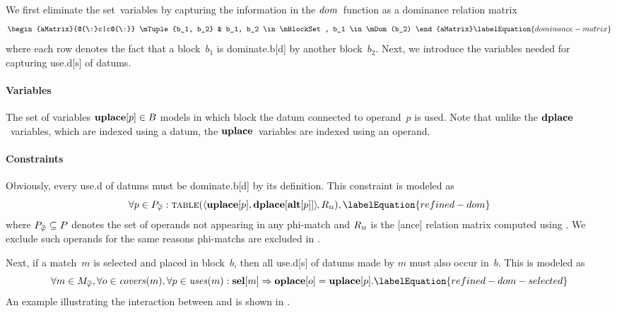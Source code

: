 We first eliminate the set~\glspl{variable} by capturing the information in the
$\operatorname{\textrm{\textit{dom}}}$~\gls{function} as a dominance relation matrix
%
\begin{equation}
  \begin{aMatrix}{@{\:}c|c@{\:}}
      \mTuple{b_1, b_2}
    & b_1, b_2 \in \mBlockSet, b_1 \in \mDom(b_2)
  \end{aMatrix}
  \labelEquation{dominance-matrix}
\end{equation}
%
where each row denotes the fact that a \gls{block}~$b_1$ is \gls{dominate.b}[d]
by another \gls{block}~$b_2$.
%
Next, we introduce the \glspl{variable} needed for capturing \gls{use.d}[s] of
\glspl{datum}.


\paragraph{Variables}

The set of \glspl{variable} \mbox{$\mVar{uplace}[p] \in \mBlockSet$} models in
which \gls{block} the \gls{datum} connected to \gls{operand}~$p$ is used.
%
Note that unlike the $\mVar{dplace}$~\glspl{variable}, which are indexed using a
\gls{datum}, the $\mVar{uplace}$~\glspl{variable} are indexed using an
\gls{operand}.


\paragraph{Constraints}

Obviously, every \gls{use.d} of \glspl{datum} must be \gls{dominate.b}[d] by its
definition.
%
This \gls{constraint} is modeled as
%
\begin{equation}
  \forall p \in \mPhiOperandCompSet :
  \mTable(
    \mTuple{\mVar{uplace}[p], \mVar{dplace}[\mVar{alt}[p]]} \hspace{-1pt},
    \mDomMatrix
  ),
  \labelEquation{refined-dom}
\end{equation}
%
where \mbox{$\mPhiOperandCompSet \subseteq \mOperandSet$} denotes the set of
\glspl{operand} not appearing in any \gls{phi-match} and $R_{\textsc{m}}$ is the
[ance] relation matrix computed using
.
%
We exclude such \glspl{operand} for the same reasons \glspl{phi-match} are
excluded in .

Next, if a \gls{match}~$m$ is selected and placed in
\gls{block}~$b$\hspace{-1pt}, then all \gls{use.d}[s] of \glspl{datum} made by
$m$ must also occur in~$b$\hspace{-1pt}.
%
This is modeled as
%
\begin{equation}
  \forall m \in \mPhiMatchCompSet,
  \forall o \in \mCovers(m),
  \forall p \in \mUses(m) :
  \mVar{sel}[m] \mImp \mVar{oplace}[o] = \mVar{uplace}[p].
  \labelEquation{refined-dom-selected}
\end{equation}
%
An example illustrating the interaction between  and
 is shown in .

